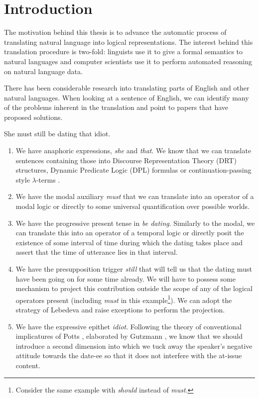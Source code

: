\chapter{Introduction}

The motivation behind this thesis is to advance the automatic process of
translating natural language into logical representations. The interest
behind this translation procedure is two-fold: linguists use it to give a
formal semantics to natural languages and computer scientists use it to
perform automated reasoning on natural language data.

There has been considerable research into translating parts of English and
other natural languages. When looking at a sentence of English, we can
identify many of the problems inherent in the translation and point to
papers that have proposed solutions.

\begin{exe}
  \ex She must still be dating that idiot.
\end{exe}

\begin{enumerate}
  \item \label{item:first-feature} We have anaphoric expressions,
    \emph{she} and \emph{that}. We know that we can translate sentences
    containing those into Discourse Representation Theory (DRT)
    \cite{kamp1993discourse} structures, Dynamic Predicate Logic (DPL)
    \cite{groenendijk1991dynamic} formulas or continuation-passing style
    $\lambda$-terms \cite{de2006towards}.
  \item We have the modal auxiliary \emph{must} that we can translate into
    an operator of a modal logic or directly to some universal
    quantification over possible worlds.
  \item We have the progressive present tense in \emph{be
    dating}. Similarly to the modal, we can translate this into an operator
    of a temporal logic or directly posit the existence of some interval of
    time during which the dating takes place and assert that the time of
    utterance lies in that interval.
  \item We have the presupposition trigger \emph{still} that will tell us
    that the dating must have been going on for some time already. We will
    have to possess some mechanism to project this contribution outside the
    scope of any of the logical operators present (including \emph{must} in
    this example\footnote{Consider the same example with \emph{should}
      instead of \emph{must}.}). We can adopt the strategy of Lebedeva
    \cite{lebedeva2012expression} and raise exceptions to perform the
    projection.
  \item \label{item:last-feature} We have the expressive epithet
    \emph{idiot}. Following the theory of conventional implicatures of
    Potts \cite{potts2005logic}, elaborated by Gutzmann
    \cite{gutzmann2015use}, we know that we should introduce a second
    dimension into which we tuck away the speaker's negative attitude
    towards the date-ee so that it does not interfere with the at-issue
    content.
\end{enumerate}

